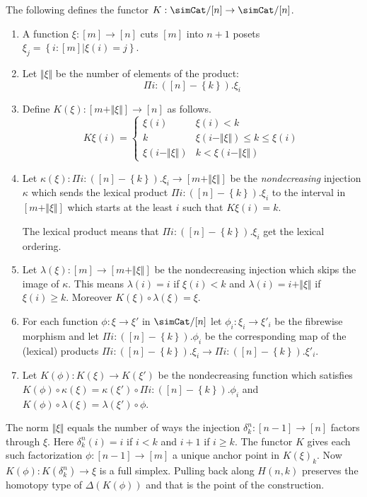 \documentclass{tac}
\newcommand\set[1]{\left\{#1\right\}}
\newcommand\of{:}
\newcommand\norm[1]{\Vert #1 \Vert}
\newcommand\ka\kappa
\newcommand\la\lambda
\begin{document}
\begin{definition}
The following defines the functor $K\of\simCat/[n]\to\simCat/[n]$.
\begin{enumerate}
\item A function $\xi\of[m]\to[n]$ cuts $[m]$ into $n+1$ posets $\xi_j = \set{i\of[m]|\xi(i)=j}$. 
\item Let $\norm \xi$ be the number of elements of the product: \[\Pi i\of ([n]-\set k).\xi_i\] 
\item Define $K(\xi)\of [m+\norm\xi]\to [n]$ as follows.
\[ 
	K\xi(i) = \left\{
		\begin{array}{cc}
			\xi(i) & \xi(i)<k \\
			k & \xi(i-\norm\xi)\leq k \leq \xi(i)\\
			\xi(i-\norm\xi) & k<\xi(i-\norm\xi)
		\end{array}
	\right.
\]
\item Let $\ka(\xi)\of\Pi i\of([n]-\set k).\xi_i \to [m+\norm\xi]$ be the \emph{nondecreasing} injection $\ka$ which sends the lexical product $\Pi i\of([n]-\set k).\xi_i$ to the interval in $[m+\norm\xi]$ which starts at the least $i$ such that $K\xi(i)=k$.

The lexical product means that $\Pi i\of([n]-\set k).\xi_i$ get the lexical ordering. %

\item Let $\la(\xi)\of[m]\to[m+\norm\xi]$ be the nondecreasing injection which skips the image of $\ka$. This means $\la(i)=i$ if $\xi(i)<k$ and $\la(i)=i+\norm\xi$ if $\xi(i)\geq k$. Moreover $K(\xi)\circ\la(\xi) = \xi$.
\item For each function $\phi\of\xi\to\xi'$ in $\simCat/[n]$ let $\phi_i\of\xi_i\to\xi'_i$ be the fibrewise morphism and let $\Pi i\of([n]-\set k).\phi_i$ be the corresponding map of the (lexical) products $\Pi i\of([n]-\set k).\xi_i\to\Pi i\of([n]-\set k).\xi'_i$.
\item Let $K(\phi)\of K(\xi)\to K(\xi')$ be the nondecreasing function which satisfies $K(\phi)\circ \ka(\xi) = \ka(\xi')\circ \Pi i\of([n]-\set k).\phi_i$ and $K(\phi)\circ \la(\xi) = \la(\xi')\circ \phi$.
\end{enumerate}
\end{definition}

The norm $\norm\xi$ equals the number of ways the injection $\delta^n_k\of[n-1]\to[n]$ factors through $\xi$. Here $\delta^n_k(i)=i$ if $i<k$ and $i+1$ if $i\geq k$. The functor $K$ gives each such factorization $\phi\of[n-1]\to [m]$ a unique anchor point in $K(\xi)_k$. Now $K(\phi)\of K(\delta^n_k)\to \xi$ is a full simplex. Pulling back along $H(n,k)$ preserves the homotopy type of $\Delta(K(\phi))$ and that is the point of the construction.
\end{document}
